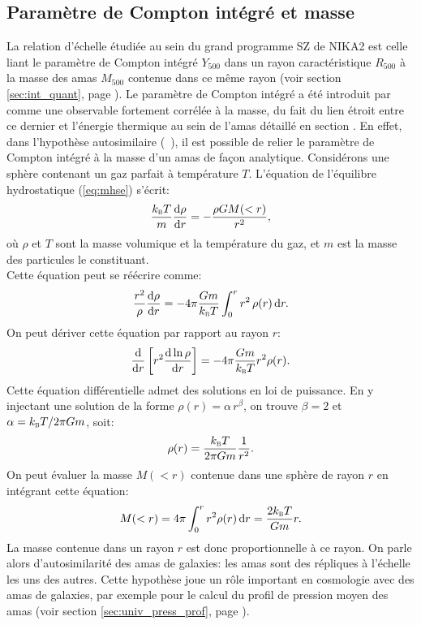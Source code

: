 \subsection{Paramètre de Compton intégré et masse}
\label{sec:scaling:sz}

La relation d'échelle étudiée au sein du grand programme SZ de NIKA2 est celle liant le paramètre de Compton intégré $Y_{500}$ dans un rayon caractéristique $R_{500}$ à la masse des amas $M_{500}$ contenue dans ce même rayon (voir section \ref{sec:int_quant}, page \pageref{sec:int_quant}).
Le paramètre de Compton intégré a été introduit par  comme une observable fortement corrélée à la masse, du fait du lien étroit entre ce dernier et l'énergie thermique au sein de l'amas détaillé en section .
En effet, dans l'hypothèse autosimilaire (\eg\ \cite{kravtsov_new_2006, kaiser_evolution_1991}), il est possible de relier le paramètre de Compton intégré à la masse d'un amas de façon analytique.
Considérons une sphère contenant un gaz parfait à température $T$.
L'équation de l'équilibre hydrostatique (\ref{eq:mhse}) s'écrit:
\begin{equation}
    \frac{k_\textsc{b} T}{m} \frac{\mathrm{d} \rho}{\mathrm{d} r} = -\frac{\rho G M(<r)}{r^2},
\end{equation}
où $\rho$ et $T$ sont la masse volumique et la température du gaz, et $m$ est la masse des particules le constituant. \\
Cette équation peut se réécrire comme:
\begin{equation}
    \frac{r^2}{\rho} \frac{\mathrm{d} \rho}{\mathrm{d} r} = -4 \pi \frac{Gm}{k_\textsc{b} T} \int_0^r r^2 \, \rho(r) \, \mathrm{d} r.
\end{equation}
On peut dériver cette équation par rapport au rayon $r$:
\begin{equation}
    \frac{\mathrm{d}}{\mathrm{d} r} \left[ r^2 \frac{\mathrm{d} \ln \rho}{\mathrm{d} r}\right] = -4\pi\frac{Gm}{k_\textsc{b}T} r^2 \rho(r).
\end{equation}
Cette équation différentielle admet des solutions en loi de puissance.
En y injectant une solution de la forme $\rho(r) = \alpha \, r^\beta$, on trouve $\beta=2$ et $\alpha=k_\textsc{b} T / 2\pi G m$, soit:
\begin{equation}
    \rho(r) = \frac{k_\textsc{b} T}{2\pi G m} \frac{1}{r^2}.
\end{equation}
On peut évaluer la masse $M(<r)$ contenue dans une sphère de rayon $r$ en intégrant cette équation:
\begin{equation}
    M(<r) = 4\pi \int_0^r r^2 \rho(r) \, \mathrm{d} r = \frac{2 k_\textsc{b} T}{Gm}r.
\end{equation}
La masse contenue dans un rayon $r$ est donc proportionnelle à ce rayon.
On parle alors d'autosimilarité des amas de galaxies: les amas sont des répliques à l'échelle les uns des autres.
Cette hypothèse joue un rôle important en cosmologie avec des amas de galaxies, par exemple pour le calcul du profil de pression moyen des amas (voir section \ref{sec:univ_press_prof}, page \pageref{sec:univ_press_prof}).

